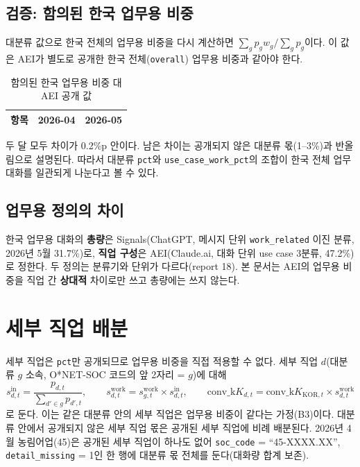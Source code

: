 \documentclass[11pt]{article}
\begin{document}
\subsection{검증: 함의된 한국 업무용 비중}
대분류 값으로 한국 전체의 업무용 비중을 다시 계산하면 $\sum_g p_g w_g / \sum_g p_g$이다. 이 값은 AEI가 별도로 공개한 한국 전체(\texttt{overall}) 업무용 비중과 같아야 한다.

\begin{table}[h]
\centering
\caption{함의된 한국 업무용 비중 대 AEI 공개 값}\label{tab:workpct}
\begin{tabular}{lrr}
\toprule
항목 & 2026-04 & 2026-05 \\
\midrule

\bottomrule
\end{tabular}
\end{table}

두 달 모두 차이가 0.2\%p 안이다. 남은 차이는 공개되지 않은 대분류 몫(1--3\%)과 반올림으로 설명된다. 따라서 대분류 \texttt{pct}와 \texttt{use\_case\_work\_pct}의 조합이 한국 전체 업무 대화를 일관되게 나눈다고 볼 수 있다.

\subsection{업무용 정의의 차이}
한국 업무용 대화의 \textbf{총량}은 Signals(ChatGPT, 메시지 단위 \texttt{work\_related} 이진 분류, 2026년 5월 31.7\%)로, \textbf{직업 구성}은 AEI(Claude.ai, 대화 단위 use case 3분류, 47.2\%)로 정한다. 두 정의는 분류기와 단위가 다르다(report 18). 본 문서는 AEI의 업무용 비중을 직업 간 \textbf{상대적} 차이로만 쓰고 총량에는 쓰지 않는다.

\section{세부 직업 배분}

세부 직업은 \texttt{pct}만 공개되므로 업무용 비중을 직접 적용할 수 없다. 세부 직업 $d$(대분류 $g$ 소속, O*NET-SOC 코드의 앞 2자리 = $g$)에 대해
\[
  s^{\text{in}}_{d,t} = \frac{p_{d,t}}{\sum_{d' \in g} p_{d',t}}, \qquad
  s^{\text{work}}_{d,t} = s^{\text{work}}_{g,t} \times s^{\text{in}}_{d,t}, \qquad
  \text{conv\_k}K_{d,t} = \text{conv\_k}K_{\text{KOR},t} \times s^{\text{work}}_{d,t}
\]
로 둔다. 이는 같은 대분류 안의 세부 직업은 업무용 비중이 같다는 가정(B3)이다. 대분류 안에서 공개되지 않은 세부 직업 몫은 공개된 세부 직업에 비례 배분된다. 2026년 4월 농림어업(45)은 공개된 세부 직업이 하나도 없어 \texttt{soc\_code} = ``45-XXXX.XX'', \texttt{detail\_missing} = 1인 한 행에 대분류 몫 전체를 둔다(대화량 합계 보존).
\end{document}
